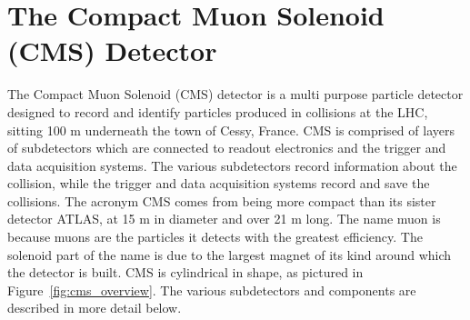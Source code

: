 \section{The Compact Muon Solenoid (CMS) Detector}
\label{sec:cms}
The Compact Muon Solenoid (CMS) detector is a multi purpose particle detector designed to record and identify particles produced in collisions at the LHC, sitting 100 m underneath
the town of Cessy, France. CMS is comprised of layers of subdetectors which are connected to readout electronics and the trigger and data acquisition systems.
The various subdetectors record information about the collision, while the trigger and
data acquisition systems record and save the collisions. The acronym CMS comes from being more compact than its sister detector ATLAS, at 15 m in diameter and
over 21 m long. The name muon is because muons are the particles it detects with the greatest efficiency. The solenoid part of the name is due to the largest magnet of its kind
around which the detector is built. CMS is cylindrical in shape, as pictured in Figure~\ref{fig:cms_overview}. The various subdetectors and components are described in more
detail below. 



